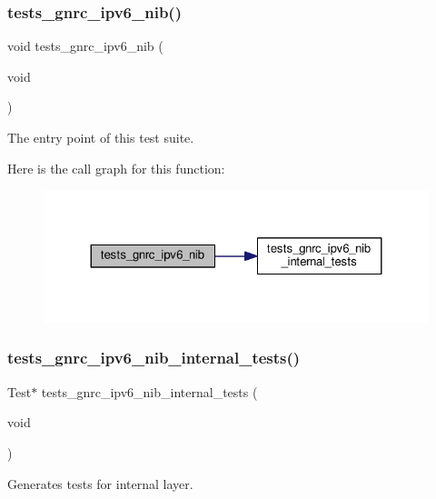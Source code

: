 \subsubsection{\texorpdfstring{tests\+\_\+gnrc\+\_\+ipv6\+\_\+nib()}{tests\_gnrc\_ipv6\_nib()}}
{\footnotesize\ttfamily void tests\+\_\+gnrc\+\_\+ipv6\+\_\+nib (\begin{DoxyParamCaption}\item[{void}]{ }\end{DoxyParamCaption})}



The entry point of this test suite. 

Here is the call graph for this function\+:
\nopagebreak
\begin{figure}[H]
\begin{center}
\leavevmode
\includegraphics[width=324pt]{group__unittests_ga94ab40380fa6a4f0472a693ef6b5a9c3_cgraph}
\end{center}
\end{figure}
\mbox{\label{group__unittests_gabe2d41bf28233304c4a66a8ac44c9404}} 
\subsubsection{\texorpdfstring{tests\+\_\+gnrc\+\_\+ipv6\+\_\+nib\+\_\+internal\+\_\+tests()}{tests\_gnrc\_ipv6\_nib\_internal\_tests()}}
{\footnotesize\ttfamily Test$\ast$ tests\+\_\+gnrc\+\_\+ipv6\+\_\+nib\+\_\+internal\+\_\+tests (\begin{DoxyParamCaption}\item[{void}]{ }\end{DoxyParamCaption})}



Generates tests for internal layer. 

